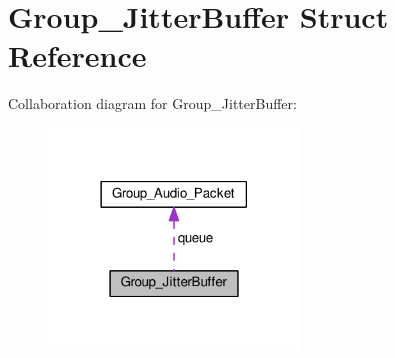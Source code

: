 \hypertarget{struct_group___jitter_buffer}{\section{Group\+\_\+\+Jitter\+Buffer Struct Reference}
\label{struct_group___jitter_buffer}
}


Collaboration diagram for Group\+\_\+\+Jitter\+Buffer\+:\nopagebreak
\begin{figure}[H]
\begin{center}
\leavevmode
\includegraphics[width=189pt]{struct_group___jitter_buffer__coll__graph}
\end{center}
\end{figure}

